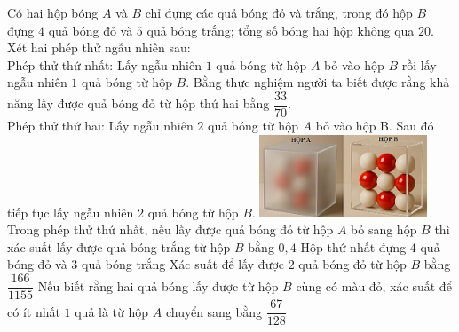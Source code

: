 \begin{ex}%
\immini
{
    Có hai hộp bóng $A$ và $B$ chỉ đựng các quả bóng đỏ và trắng, trong đó hộp $B$ đựng $4$ quả bóng đỏ và $5$ quả bóng trắng; tổng số bóng hai hộp không qua $20$. Xét hai phép thử ngẫu nhiên sau:\\
Phép thử thứ nhất: Lấy ngẫu nhiên $1$ quả bóng từ hộp $A$ bỏ vào hộp $B$ rồi lấy ngẫu nhiên $1$ quả bóng từ hộp $B$. Bằng thực nghiệm người ta biết được rằng khả năng lấy được quả bóng đỏ từ hộp thứ hai bằng $\dfrac{33}{70}$.\\
Phép thử thứ hai: Lấy ngẫu nhiên $2$ quả bóng từ hộp $A$ bỏ vào hộp B. Sau đó tiếp tục lấy ngẫu nhiên $2$ quả bóng từ hộp $B$.
}
{
\includegraphics[width=5cm]{img/HXN-2-16}
}
\choiceTF
    {Trong phép thử thứ nhất, nếu lấy được quả bóng đỏ từ hộp $A$ bỏ sang hộp $B$ thì xác suất lấy được quả bóng trắng từ hộp $B$ bằng $0{,}4$}
    {Hộp thứ nhất đựng $4$ quả bóng đỏ và $3$ quả bóng trắng
    }
    {Xác suất để lấy được $2$ quả bóng đỏ từ hộp $B$ bằng $\dfrac{166}{1155}$}
    {Nếu biết rằng hai quả bóng lấy được từ hộp $B$ cùng có màu đỏ, xác suất để có ít nhất $1$ quả là từ hộp $A$ chuyển sang bằng $\dfrac{67}{128}$}
\end{ex}
